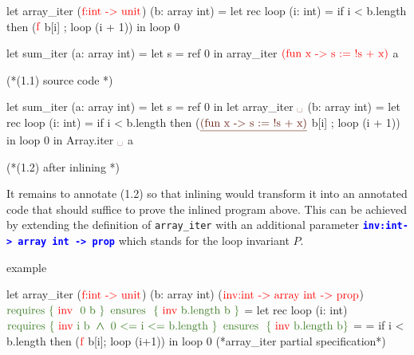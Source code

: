 \documentclass[a4paper,11pt,oneside]{article}
\theoremstyle{plain}
\newcommand{\bwedge}{\boldsymbol{~\wedge~}}
\begin{document}
\begin{adjustwidth}{-1em}{-2em}
\begin{footnotesize}
\begin{minipage}[t]{0.3\linewidth}
	\begin{whycode}  
   let array_iter ($\textcolor{red}{\text{f:int -> unit}}$) (b: array int)   
   = let rec loop (i: int) =  
       if i < b.length 
       then ($\textcolor{red}{\text{f}}$ b[i] ; loop (i + 1)) 
     in loop 0
   
   let sum_iter (a: array int) =		 
     let s = ref 0 in
     array_iter $\textcolor{red}{\text{(fun x -> s := !s + x)}}$ a  
     
  (*(1.1) source code *)   
 	\end{whycode}
 	\end{minipage}\hfill\vline
 \begin{minipage}[t]{0.45\linewidth} 

	\begin{whycode}  
   let sum_iter (a: array int) =		
     let s = ref 0 in
     let array_iter $\textcolor{Sepia}{\text{\textvisiblespace}}$ (b: array int)   
     = let rec loop (i: int) =  
         if i < b.length then
         ($\textcolor{Sepia}{\text{\underline{(fun x -> s := !s + x)}}}$ b[i] ; 
         loop (i + 1)) 
       in loop 0   
     in Array.iter $\textcolor{Sepia}{\text{\textvisiblespace}}$ a   
     
    (*(1.2) after inlining *)
 	\end{whycode}
 	\end{minipage}
 \end{footnotesize}
\end{adjustwidth}

It remains to annotate (1.2) so that inlining would transform it into an annotated code that should suffice to prove the inlined program above. 
This can be achieved by extending the definition of \texttt{array\_iter} with an additional parameter \textcolor{blue}{\texttt{\textbf{inv:int-> array int -> prop}}} which stands for the loop invariant $P$. 
\begin{small}\hypertarget{sum-iter}{example}
\begin{whycode}  
   let array_iter ($\textcolor{red}{\text{f:int -> unit}}$) (b: array int) ($\textcolor{red}{\text{inv:int -> array int -> prop}}$)    
     $\textcolor{OliveGreen}{\text{requires \{ \textcolor{red}{\text{inv }} 0~b \}}}$
     $\textcolor{OliveGreen}{\text{ensures~~}\{ \text{ \textcolor{red}{inv} b.length~b }\}}$  
   = let rec loop (i: int)
       $\textcolor{OliveGreen}{ \text{requires \{~\textcolor{red}{inv} i b} \bwedge \text{0 <= i <= b.length}~\}}$
       $\textcolor{OliveGreen}{\text{ensures~~}\{ \text{ \textcolor{red}{inv} b.length~b}\}}$ =    
       = if i < b.length then ($\textcolor{red}{\text{f}}$ b[i]; loop (i+1)) 
     in loop 0       
                                          (*array_iter partial specification*)
\end{whycode}
\end{small}
\end{document}
